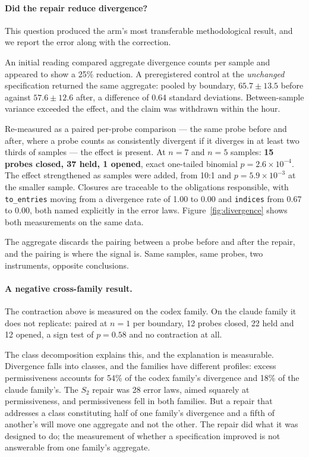 \documentclass[10pt,twocolumn]{article}
\begin{document}
\paragraph{Did the repair reduce divergence?} This question produced the
arm's most transferable methodological result, and we report the error
along with the correction.

An initial reading compared aggregate divergence counts per sample and
appeared to show a 25\% reduction. A preregistered control at the
\emph{unchanged} specification returned the same aggregate: pooled by
boundary, $65.7 \pm 13.5$ before against $57.6 \pm 12.6$ after, a
difference of 0.64 standard deviations. Between-sample variance exceeded
the effect, and the claim was withdrawn within the hour.

Re-measured as a paired per-probe comparison --- the same probe before
and after, where a probe counts as consistently divergent if it diverges
in at least two thirds of samples --- the effect is present. At
$n=7$ and $n=5$ samples: \textbf{15 probes closed, 37 held, 1 opened},
exact one-tailed binomial $p = 2.6 \times 10^{-4}$. The effect
strengthened as samples were added, from 10:1 and $p = 5.9 \times 10^{-3}$
at the smaller sample. Closures are traceable to the obligations
responsible, with \texttt{to\_entries} moving from a divergence rate of
1.00 to 0.00 and \texttt{indices} from 0.67 to 0.00, both named
explicitly in the error laws. Figure~\ref{fig:divergence} shows both
measurements on the same data.

The aggregate discards the pairing between a probe before and after the
repair, and the pairing is where the signal is. Same samples, same
probes, two instruments, opposite conclusions.

\paragraph{A negative cross-family result.} The contraction above is
measured on the codex family. On the claude family it does not replicate:
paired at $n=1$ per boundary, 12 probes closed, 22 held and 12 opened, a
sign test of $p = 0.58$ and no contraction at all.

The class decomposition explains this, and the explanation is measurable.
Divergence falls into classes, and the families have different profiles:
excess permissiveness accounts for 54\% of the codex family's divergence
and 18\% of the claude family's. The $S_2$ repair was 28 error laws,
aimed squarely at permissiveness, and permissiveness fell in both
families. But a repair that addresses a class constituting half of one
family's divergence and a fifth of another's will move one aggregate and
not the other. The repair did what it was designed to do; the measurement
of whether a specification improved is not answerable from one family's
aggregate.
\end{document}
